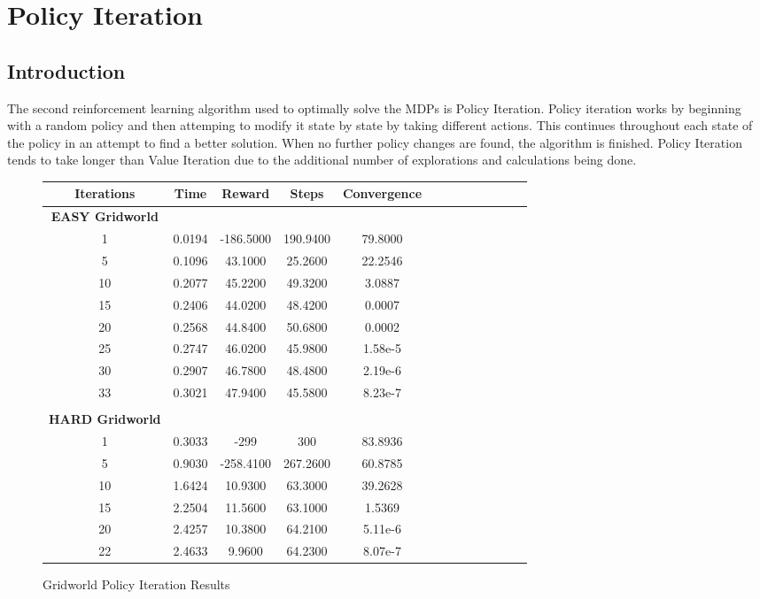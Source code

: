 \documentclass[h]{article}
\begin{document}
 
\section*{Policy Iteration}
\subsection*{Introduction}
The second reinforcement learning algorithm used to optimally solve the MDPs is 
Policy Iteration.  Policy iteration works by beginning with a random policy and then 
attemping to modify it state by state by taking different actions.  This continues throughout each state of the policy in an attempt
 to find a better solution.  When no further policy changes are found, the algorithm 
 is finished.  Policy Iteration tends to take longer than Value Iteration due to 
 the additional number of explorations and calculations being done.
 
  \begin{figure}[H] 
\centering
\begin{tabular}{ | c | c  | c | c | c | c | c | c| c| c| c| c| c | } 
\hline
\textbf{Iterations} & \textbf{Time} & \textbf{Reward} & \textbf{Steps} & \textbf{Convergence}   \\
\hline
\textbf{EASY Gridworld} \\ \hline
1 & 0.0194 & -186.5000 & 190.9400 & 79.8000 \\ \hline
5 & 0.1096 & 43.1000 & 25.2600 & 22.2546 \\ \hline
10 & 0.2077 & 45.2200 & 49.3200 & 3.0887 \\ \hline
15 & 0.2406 & 44.0200 & 48.4200 & 0.0007 \\ \hline
20 & 0.2568 & 44.8400 & 50.6800 & 0.0002 \\ \hline
25 & 0.2747 & 46.0200 & 45.9800 & 1.58e-5 \\ \hline
30 & 0.2907 & 46.7800 & 48.4800 & 2.19e-6 \\ \hline
33 & 0.3021 & 47.9400 & 45.5800 & 8.23e-7 \\ \hline
\\
\textbf{HARD Gridworld} \\ \hline
1 & 0.3033 & -299 & 300 & 83.8936 \\ \hline
5 & 0.9030 & -258.4100 & 267.2600 & 60.8785 \\ \hline
10 & 1.6424 & 10.9300 & 63.3000 & 39.2628 \\ \hline
15 & 2.2504 & 11.5600 & 63.1000 & 1.5369 \\ \hline
20 & 2.4257 & 10.3800 & 64.2100 & 5.11e-6 \\ \hline
22 & 2.4633 & 9.9600 & 64.2300 & 8.07e-7 \\ \hline

\end{tabular}
\caption*{Gridworld Policy Iteration Results} 
\end{figure}
\end{document}
